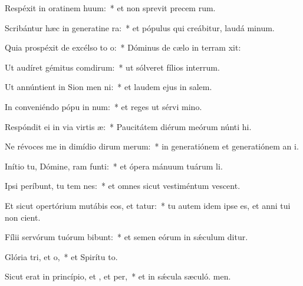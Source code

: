 \item Respéxit in oratinem huum:~* et non sprevit precem rum.
\item Scribántur hæc in generatine ra:~* et pópulus qui creábitur, laudá minum.
\item Quia prospéxit de excélso to o:~* Dóminus de cælo in terram xit:
\item Ut audíret gémitus comdirum:~* ut sólveret fílios interrum.
\item Ut annúntient in Sion men ni:~* et laudem ejus in salem.
\item In conveniéndo pópu in num:~* et reges ut sérvi mino.
\item Respóndit ei in via virtis æ:~* Paucitátem diérum meórum núnti hi.
\item Ne révoces me in dimídio dirum merum:~* in generatiónem et generatiónem an i.
\item Inítio tu, Dómine, ram funti:~* et ópera mánuum tuárum  li.
\item Ipsi períbunt, tu tem nes:~* et omnes sicut vestiméntum vescent.
\item Et sicut opertórium mutábis eos, et tatur:~* tu autem idem ipse es, et anni tui non cient.
\item Fílii servórum tuórum bibunt:~* et semen eórum in sǽculum ditur.
\item Glória tri, et o,~* et Spirítu to.
\item Sicut erat in princípio, et , et per,~* et in sǽcula sæculó. men.
